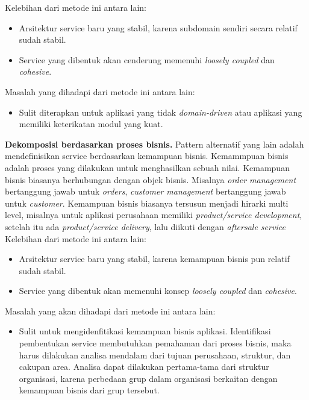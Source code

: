 Kelebihan dari metode ini antara lain:
\begin{itemize}[leftmargin=*]
	\item Arsitektur service baru yang stabil, karena subdomain sendiri secara relatif sudah stabil.
	\item Service yang dibentuk akan cenderung memenuhi \textit{loosely coupled} dan \textit{cohesive}.
\end{itemize}
Masalah yang dihadapi dari metode ini antara lain:
\begin{itemize}[leftmargin=*]
	\item Sulit diterapkan untuk aplikasi yang tidak \textit{domain-driven} atau aplikasi yang memiliki keterikatan modul yang kuat.
\end{itemize}
\textbf{Dekomposisi berdasarkan proses bisnis.} Pattern alternatif yang lain adalah mendefinisikan service berdasarkan kemampuan bisnis. Kemammpuan bisnis adalah proses yang dilakukan untuk menghasilkan sebuah nilai. Kemampuan bisnis biasanya berhubungan dengan objek bisnis. Misalnya \textit{order management} bertanggung jawab untuk \textit{orders}, \textit{customer management} bertanggung jawab untuk \textit{customer}.  Kemampuan bisnis biasanya tersusun menjadi hirarki multi level, misalnya untuk aplikasi perusahaan memiliki \textit{product/service development}, setelah itu ada \textit{product/service delivery}, lalu diikuti dengan \textit{aftersale service} \cite{6}
Kelebihan dari metode ini antara lain:
\begin{itemize}[leftmargin=*]
	\item Arsitektur service baru yang stabil, karena kemampuan bisnis pun relatif sudah stabil.
	\item Service yang dibentuk akan memenuhi konsep \textit{loosely coupled} dan \textit{cohesive}.
\end{itemize}
Masalah yang akan dihadapi dari metode ini antara lain:
\begin{itemize}[leftmargin=*]
	\item Sulit untuk mengidenfitikasi kemampuan bisnis aplikasi. Identifikasi pembentukan service membutuhkan pemahaman dari proses bisnis, maka harus dilakukan analisa mendalam dari tujuan perusahaan, struktur, dan cakupan area. Analisa dapat dilakukan pertama-tama dari struktur organisasi, karena perbedaan grup dalam organisasi berkaitan dengan kemampuan bisnis dari grup tersebut.
\end{itemize}
